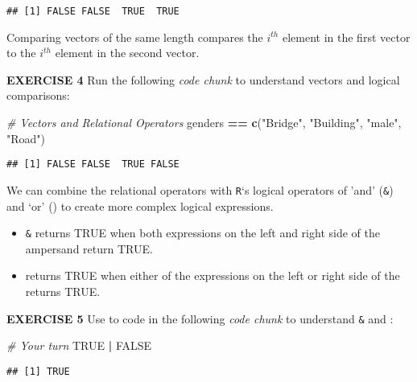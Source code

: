 \documentclass[
]{article}
\newenvironment{Shaded}{\begin{snugshade}}{\end{snugshade}}
\newcommand{\CommentTok}[1]{\textcolor[rgb]{0.56,0.35,0.01}{\textit{#1}}}
\newcommand{\KeywordTok}[1]{\textcolor[rgb]{0.13,0.29,0.53}{\textbf{#1}}}
\newcommand{\NormalTok}[1]{#1}
\newcommand{\OperatorTok}[1]{\textcolor[rgb]{0.81,0.36,0.00}{\textbf{#1}}}
\newcommand{\OtherTok}[1]{\textcolor[rgb]{0.56,0.35,0.01}{#1}}
\newcommand{\StringTok}[1]{\textcolor[rgb]{0.31,0.60,0.02}{#1}}
\begin{document}
\begin{verbatim}
## [1] FALSE FALSE  TRUE  TRUE
\end{verbatim}

Comparing vectors of the same length compares the \(i^{th}\) element in
the first vector to the \(i^{th}\) element in the second vector.

\textbf{EXERCISE 4} Run the following \emph{code chunk} to understand
vectors and logical comparisons:

\begin{Shaded}
\begin{Highlighting}[]
\CommentTok{# Vectors and Relational Operators}
\NormalTok{genders }\OperatorTok{==}\StringTok{ }\KeywordTok{c}\NormalTok{(}\StringTok{"Bridge"}\NormalTok{, }\StringTok{"Building"}\NormalTok{, }\StringTok{"male"}\NormalTok{, }\StringTok{"Road"}\NormalTok{)}
\end{Highlighting}
\end{Shaded}

\begin{verbatim}
## [1] FALSE FALSE  TRUE FALSE
\end{verbatim}

We can combine the relational operators with \texttt{R}`s logical
operators of 'and' (\texttt{\&}) and `or' (\texttt{\textbar{}}) to
create more complex logical expressions.

\begin{itemize}
\item
  \texttt{\&} returns TRUE when both expressions on the left and right
  side of the ampersand return TRUE.
\item
  \texttt{\textbar{}} returns TRUE when either of the expressions on the
  left or right side of the \texttt{\textbar{}} returns TRUE.
\end{itemize}

\textbf{EXERCISE 5} Use to code in the following \emph{code chunk} to
understand \texttt{\&} and \texttt{\textbar{}}:

\begin{Shaded}
\begin{Highlighting}[]
\CommentTok{# Your turn}
\OtherTok{TRUE} \OperatorTok{|}\StringTok{ }\OtherTok{FALSE}
\end{Highlighting}
\end{Shaded}

\begin{verbatim}
## [1] TRUE
\end{verbatim}
\end{document}
